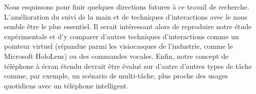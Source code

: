 Nous esquissons pour finir quelques directions futures à ce travail de recherche. L'amélioration du suivi de la main et de techniques d'interactions avec le  nous semble être le plus essentiel. Il serait intéressant alors de reproduire notre étude expérimentale et d'y comparer d'autres techniques d'interactions comme un pointeur virtuel (répandue parmi les visiocasques de l'industrie, comme le Microsoft HoloLens) ou des commandes vocales. Enfin, notre concept de téléphone à écran étendu devrait être évalué sur d'autre d'autres types de tâche comme, par exemple, un scénario de multi-tâche, plus proche des usages quotidiens avec un téléphone intelligent.